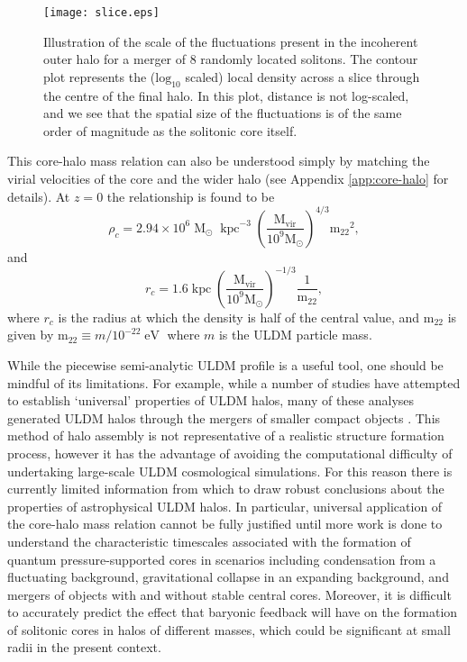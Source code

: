\documentclass{pasa}%
\begin{document}
\begin{figure}[t]
\centering
\texttt{[image: slice.eps]}
\caption{Illustration of the scale of the fluctuations present in the incoherent outer halo for a merger of 8 randomly located solitons. The contour plot represents the ($\mathrm{log}_{10}$ scaled) local density across a slice through the centre of the final halo. In this plot, distance is not log-scaled, and we see that the spatial size of the fluctuations is of the same order of magnitude as the solitonic core itself.}\label{fig:contour}
\end{figure}
%
This core-halo mass relation can also be understood simply by matching the virial velocities of the core and the wider halo (see Appendix \ref{app:core-halo} for details). 
At $z=0$ the relationship is found to be \cite{Schive:2014hza} 
%
\begin{equation}\label{eq:central_dens}
    \rho_c = 2.94\times10^6 \operatorname{M}_{\odot}\operatorname{kpc}^{-3}\left(\frac{\mathrm{M_{vir}}}{10^9 \mathrm{M_{\odot}}}\right)^{4/3}\mathrm{m_{22}}^{2},
\end{equation}
and 
\begin{equation}
    r_c = 1.6 \operatorname{kpc}\left(\frac{\mathrm{M_{vir}}}{10^9 \mathrm{M_{\odot}}}\right)^{-1/3}\frac{1}{\mathrm{m_{22}}},
\end{equation}
%
where $r_c$ is the radius at which the density is half of the central value, and $\mathrm{m_{22}}$ is given by $\mathrm{m_{22}} \equiv m / 10^{-22} \operatorname{eV}$ where $m$ is the ULDM particle mass. 

While the piecewise semi-analytic ULDM profile is a useful tool, one should be mindful of its  limitations. For example, while a number of studies have attempted to establish  `universal' properties of ULDM halos, many of these analyses generated ULDM halos through the mergers of smaller compact objects  \cite{Schwabe:2016rze, Mocz:2017wlg}. This method of halo assembly is not representative of a realistic structure formation process, however it has the advantage of avoiding the computational difficulty of undertaking large-scale ULDM cosmological simulations. For this reason there is currently limited information from which to draw robust conclusions about the properties of astrophysical ULDM halos. In particular, universal application of the core-halo mass relation cannot be fully justified until more work is done to understand the characteristic timescales associated with the formation of quantum pressure-supported cores in scenarios including condensation from a fluctuating background, gravitational collapse in an expanding background, and mergers of objects with and without stable central cores. Moreover, it is difficult to accurately predict the effect that baryonic feedback will have on the formation of solitonic cores in halos of different masses, which could be significant at small radii in the present context.
\end{document}
